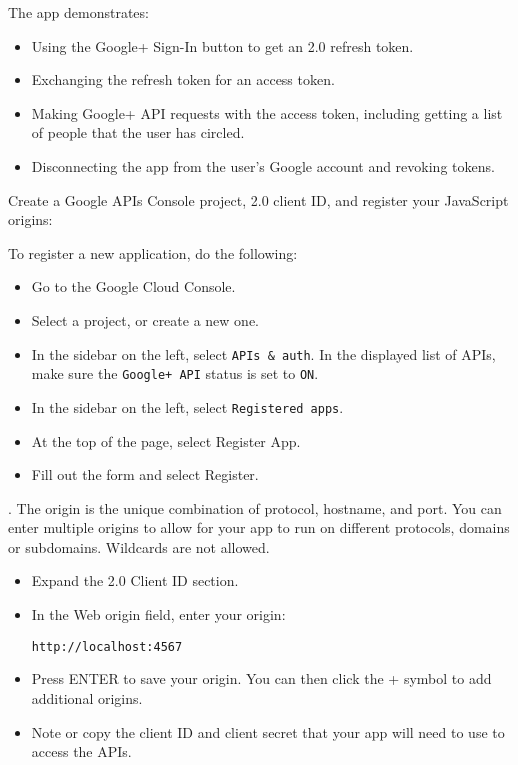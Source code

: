 The app demonstrates:

\begin{itemize}
\item
Using the Google+ Sign-In button to get an \OAuth{} 2.0 refresh token.
\item
Exchanging the refresh token for an access token.
\item
Making Google+ API requests with the access token, including getting a list of people that the user has circled.
\item
Disconnecting the app from the user's Google account and revoking tokens.
\end{itemize}


Create a Google APIs Console project, \OAuth{} 2.0 client ID, and register your JavaScript origins:

To register a new application, do the following:

\begin{itemize}
\item
Go to the Google Cloud Console.
\item
Select a project, or create a new one.
\item
In the sidebar on the left, select \verb|APIs & auth|. 
In the displayed list of APIs, make sure the \verb|Google+ API| status is set to \verb|ON|.
\item
In the sidebar on the left, select \verb|Registered apps|.
\item
At the top of the page, select Register App.
\item
Fill out the form and select Register.
\end{itemize}
. 
The origin is the unique combination of protocol, hostname, and
port. You can enter multiple origins to allow for your app to run on
different protocols, domains or subdomains. Wildcards are not allowed.

\begin{itemize}
\item
Expand the \OAuth{} 2.0 Client ID section.
\item
In the Web origin field, enter your origin:
\begin{verbatim}
http://localhost:4567
\end{verbatim}
\item
Press ENTER to save your origin. You can then click the + symbol to add additional origins.
\item
Note or copy the client ID and client secret that your app will need to use to access the APIs.
\end{itemize}

